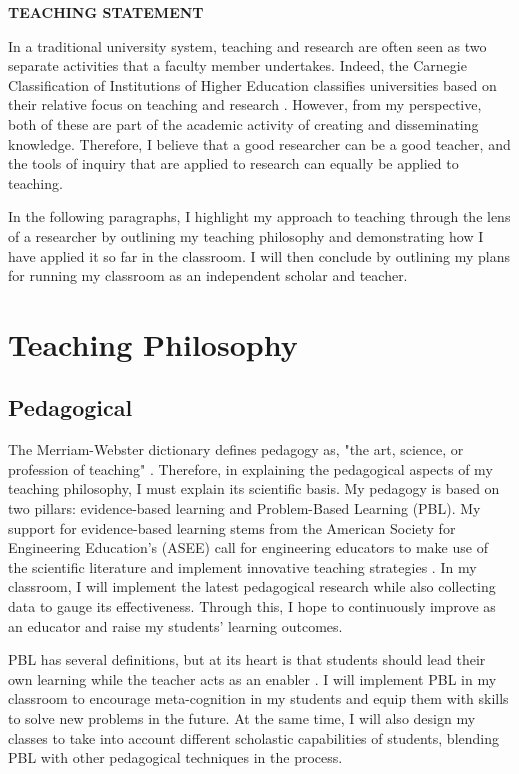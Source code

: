 \documentclass[12pt]{article}
\begin{document}
 \sloppy %
\begin{center}
{\large \uppercase{\textbf{Teaching Statement}}}
\end{center}

In a traditional university system, teaching and research are often seen as two separate activities that a faculty member undertakes. Indeed, the Carnegie Classification of Institutions of Higher Education classifies universities based on their relative focus on teaching and research \cite{carnegie1994classification}. However, from my perspective, both of these are part of the academic activity of creating and disseminating knowledge. Therefore, I believe that a good researcher can be a good teacher, and the tools of inquiry that are applied to research can equally be applied to teaching. 

In the following paragraphs, I highlight my approach to teaching through the lens of a researcher by outlining my teaching philosophy and demonstrating how I have applied it so far in the classroom. I will then conclude by outlining my plans for running my classroom as an independent scholar and teacher. 

\section*{Teaching Philosophy}
\subsection*{Pedagogical}
The Merriam-Webster dictionary defines pedagogy as, "the art, science, or profession of teaching" \cite{merriam-webster-pedagogy}. Therefore, in explaining the pedagogical aspects of my teaching philosophy, I must explain its scientific basis. My pedagogy is based on two pillars: evidence-based learning and Problem-Based Learning (PBL). My support for evidence-based learning stems from the American Society for Engineering Education's (ASEE) call for engineering educators to make use of the scientific literature and implement innovative teaching strategies \cite{jamieson2009creating}. In my classroom, I will implement the latest pedagogical research while also collecting data to gauge its effectiveness. Through this, I hope to continuously improve as an educator and raise my students' learning outcomes.

PBL has several definitions, but at its heart is that students should lead their own learning while the teacher acts as an enabler \cite{albanese1993problem}. I will implement PBL in my classroom to encourage meta-cognition in my students and equip them with skills to solve new problems in the future. At the same time, I will also design my classes to take into account different scholastic capabilities of students, blending PBL with other pedagogical techniques in the process.    
\end{document}
